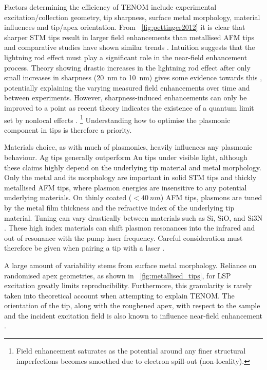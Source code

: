 \documentclass{article}
\begin{document}
Factors determining the efficiency of TENOM include experimental excitation/collection geometry, tip sharpness, surface metal morphology, material influences and tip/apex orientation. From \figurename~\ref{fig:pettinger2012} it is clear that sharper STM tips result in larger field enhancements than metallised AFM tips and comparative studies have shown similar trends \cite{raschke2003, yeo2006, picardi2007}. Intuition suggests that the lightning rod effect must play a significant role in the near-field enhancement process. Theory showing drastic increases in the lightning rod effect after only small increases in sharpness (\SI{20}{nm} to \SI{10}{nm}) gives some evidence towards this \cite{zhang2009, meng2015}, potentially explaining the varying measured field enhancements over time and between experiments. However, sharpness-induced enhancements can only be improved to a point as recent theory indicates the existence of a quantum limit set by nonlocal effects \cite{wiener2012}.%
\footnote{Field enhancement saturates as the potential around any finer structural imperfections becomes smoothed due to electron spill-out (non-locality).}
Understanding how to optimise the plasmonic component in tips is therefore a priority.

Materials choice, as with much of plasmonics, heavily influences any plasmonic behaviour. Ag tips generally outperform Au tips under visible light, although these claims highly depend on the underlying tip material and metal morphology. Only the metal and its morphology are important in solid STM tips and thickly metallised AFM tips, where plasmon energies are insensitive to any potential underlying materials. On thinly coated ($<\SI{40}{nm}$) AFM tips, plasmons are tuned by the metal film thickness \cite{huber2014} and the refractive index of the underlying tip material. Tuning can vary drastically between materials such as Si, SiO, and Si\subs3N \cite{picardi2007, taguchi2009}. These high index materials can shift plasmon resonances into the infrared and out of resonance with the pump laser frequency. Careful consideration must therefore be given when pairing a tip with a laser \cite{yeo2006, yeo2007, cui2007, hayazawa2012}.

A large amount of variability stems from surface metal morphology. Reliance on randomised apex geometries, as shown in \figurename~\ref{fig:metallised_tips}, for LSP excitation greatly limits reproducibility. Furthermore, this granularity is rarely taken into theoretical account when attempting to explain TENOM. The orientation of the tip, along with the roughened apex, with respect to the sample and the incident excitation field is also known to influence near-field enhancement \cite{yeo2006, mino2014}.
\end{document}
